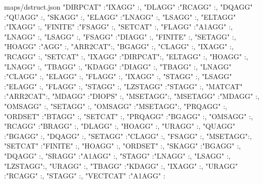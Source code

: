 \documentclass{article}
\begin{document}
\begin{chunk}{maps/dstruct.json}
{{  "DIRPCAT" :{"IXAGG"  :{}},
  "DLAGG"   :{"RCAGG"  :{}},
  "DQAGG"   :{"QUAGG"  :{}, "SKAGG"  :{}},
  "ELAGG"   :{"LNAGG"  :{}, "LSAGG"  :{}},
  "ELTAGG"  :{"IXAGG"  :{}},
  "FINITE"  :{"FSAGG"  :{}, "SETCAT" :{}},
  "FLAGG"   :{"A1AGG"  :{}, "LNAGG"  :{}, "LSAGG"  :{}},
  "FSAGG"   :{"DIAGG"  :{}, "FINITE" :{}, "SETAGG" :{}},
  "HOAGG"   :{"AGG"    :{}, "ARR2CAT":{}, "BGAGG"  :{}, "CLAGG"  :{}, 
              "IXAGG"  :{}, "RCAGG"  :{}, "SETCAT" :{}},
  "IXAGG"   :{"DIRPCAT":{}, "ELTAGG" :{}, "HOAGG"  :{}, "LNAGG"  :{}, 
              "TBAGG"  :{}},
  "KDAGG"   :{"DIAGG"  :{}, "TBAGG"  :{}},
  "LNAGG"   :{"CLAGG"  :{}, "ELAGG"  :{}, "FLAGG"  :{}, "IXAGG"  :{}, 
              "STAGG"  :{}},
  "LSAGG"   :{"ELAGG"  :{}, "FLAGG"  :{}, "STAGG"  :{}},
  "LZSTAGG" :{"STAGG"  :{}},
  "MATCAT"  :{"ARR2CAT":{}},
  "MDAGG"   :{"DIOPS"  :{}, "MSETAGG":{}},
  "MSETAGG" :{"MDAGG"  :{}, "OMSAGG" :{}, "SETAGG" :{}},
  "OMSAGG"  :{"MSETAGG":{}, "PRQAGG" :{}}, 
  "ORDSET"  :{"BTAGG"  :{}, "SETCAT" :{}},
  "PRQAGG"  :{"BGAGG"  :{}, "OMSAGG" :{}},
  "RCAGG"   :{"BRAGG"  :{}, "DLAGG"  :{}, "HOAGG"  :{}, "URAGG"  :{}},
  "QUAGG"   :{"BGAGG"  :{}, "DQAGG"  :{}},
  "SETAGG"  :{"CLAGG"  :{}, "FSAGG"  :{}, "MSETAGG":{}},
  "SETCAT"  :{"FINITE" :{}, "HOAGG"  :{}, "ORDSET" :{}},
  "SKAGG"   :{"BGAGG"  :{}, "DQAGG"  :{}},
  "SRAGG"   :{"A1AGG"  :{}},
  "STAGG"   :{"LNAGG"  :{}, "LSAGG"  :{}, "LZSTAGG":{}, "URAGG"  :{}},
  "TBAGG"   :{"KDAGG"  :{}, "IXAGG"  :{}},
  "URAGG"   :{"RCAGG"  :{}, "STAGG"  :{}},
  "VECTCAT" :{"A1AGG"  :{}}
 }
}\end{chunk}
\end{document}
